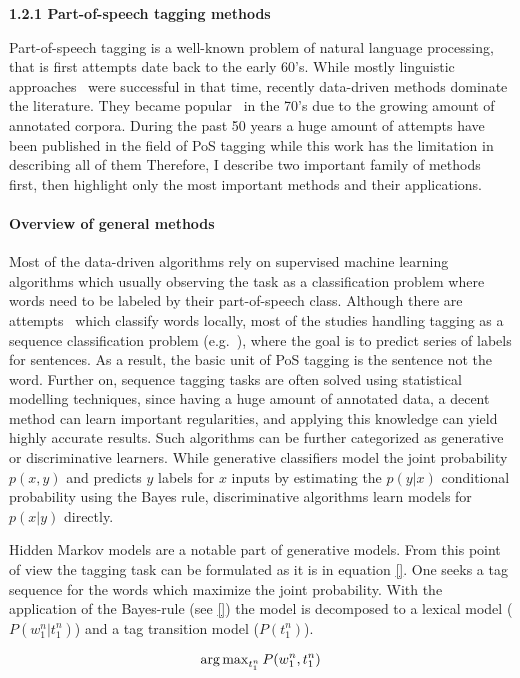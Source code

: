 \textbf{1.2.1 Part-of-speech tagging methods }

Part-of-speech tagging is a well-known problem of natural language processing, that is first attempts date back to the early 60’s.
While mostly linguistic approaches~\cite{} were successful in that time, recently data-driven methods dominate the literature.
They became popular~\cite{} in the 70’s due to the growing amount of annotated corpora.
During the past 50 years a huge amount of attempts have been published in the field of PoS tagging while this work has the limitation in describing all of them Therefore, I describe two important family of methods first, then highlight only the most important methods and their applications.

\paragraph{Overview of general methods}

Most of the data-driven algorithms rely on supervised machine learning algorithms which usually observing the task as a classification problem where words need to be labeled by their part-of-speech class.
Although there are attempts~\cite{} which classify words locally, most of the studies handling tagging as a sequence classification problem (e.g.~\cite{}), where the goal is to predict series of labels for sentences.
As a result, the basic unit of PoS tagging is the sentence not the word.
Further on, sequence tagging tasks are often solved using statistical modelling techniques, since having a huge amount of annotated data, a decent method can learn important regularities, and applying this knowledge can yield highly accurate results.
Such algorithms can be further categorized as generative or discriminative learners.
While generative classifiers model the joint probability $p(x,y)$ and predicts $y$ labels for $x$ inputs by estimating the $p(y|x)$ conditional probability using the Bayes rule, discriminative algorithms learn models for $p(x|y)$ directly.

Hidden Markov models are a notable part of generative models.
From this point of view the tagging task can be formulated as it is in equation \eqref{}.
One seeks a tag sequence for the words which maximize the joint probability.
With the application of the Bayes-rule (see \eqref{}) the model is decomposed to a lexical model ($P(w_1^n|t_1^n)$) and a tag transition model ($P(t_1^n)$).

\begin{equation}
\operatorname{arg\,max}_{t_1^n} P(w_1^n, t_1^n)
\end{equation}

